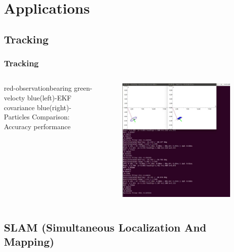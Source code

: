 \documentclass[14pt,hyperref={CJKbookmarks=true}]{beamer}
\theoremstyle{plain}
\theoremstyle{definition}
\theoremstyle{remark}
\begin{document}
\section{Applications}
\frame{\tableofcontents[currentsection]}


\subsection{Tracking}

\begin{frame}
\frametitle{Tracking}\small
\begin{columns}
red-observationbearing
green-velocty
blue(left)-EKF covariance
blue(right)-Particles
Comparison:
Accuracy
performance
\begin{figure}
\centering
\includegraphics[width=1\linewidth]{tracking.jpg}
\end{figure}
\end{columns}
\end{frame}


\subsection{SLAM (Simultaneous Localization And Mapping)}
\end{document}
